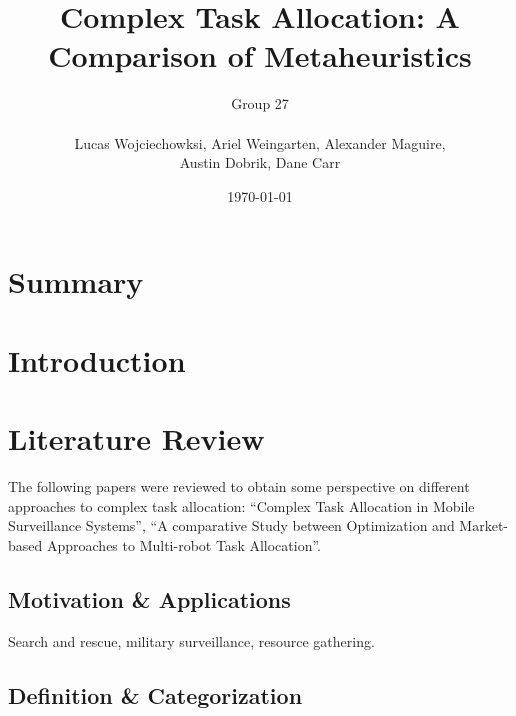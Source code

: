 \documentclass[a4paper]{article}
\title{Complex Task Allocation: A Comparison of Metaheuristics}
\author{
	Group 27 \\
	\\
	Lucas Wojciechowksi, Ariel Weingarten, Alexander Maguire, \\
	Austin Dobrik, Dane Carr}
\date{\today}
\begin{document}
\maketitle

\section*{Summary}


\section{Introduction}



\section{Literature Review}
The following papers were reviewed to obtain some perspective on different approaches to complex task allocation:
``Complex Task Allocation in Mobile Surveillance Systems'', ``A comparative Study between Optimization and
Market-based Approaches to Multi-robot Task Allocation''.

\subsection{Motivation \& Applications}
Search and rescue, military surveillance, resource gathering.

\subsection{Definition \& Categorization}
\end{document}
